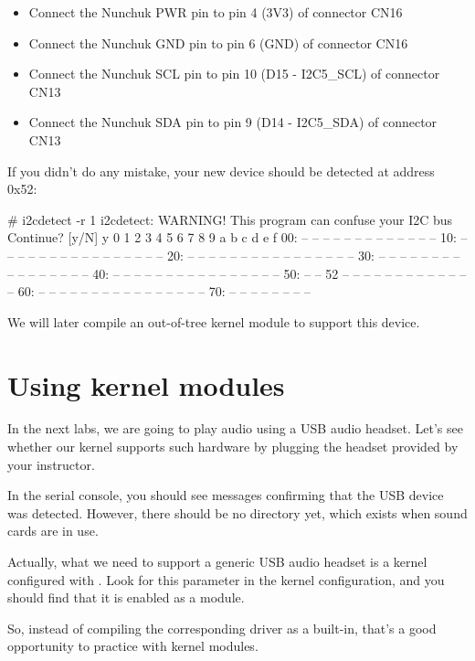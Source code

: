 \begin{itemize}
\item Connect the Nunchuk PWR pin to pin 4 (3V3) of connector CN16
\item Connect the Nunchuk GND pin to pin 6 (GND) of connector CN16
\item Connect the Nunchuk SCL pin to pin 10 (D15 - I2C5\_SCL) of connector CN13
\item Connect the Nunchuk SDA pin to pin 9 (D14 - I2C5\_SDA) of connector CN13
\end{itemize}

If you didn't do any mistake, your new device should be detected at
address 0x52:

\begin{bashinput}
# i2cdetect -r 1
i2cdetect: WARNING! This program can confuse your I2C bus
Continue? [y/N] y
     0  1  2  3  4  5  6  7  8  9  a  b  c  d  e  f
00:          -- -- -- -- -- -- -- -- -- -- -- -- --
10: -- -- -- -- -- -- -- -- -- -- -- -- -- -- -- --
20: -- -- -- -- -- -- -- -- -- -- -- -- -- -- -- --
30: -- -- -- -- -- -- -- -- -- -- -- -- -- -- -- --
40: -- -- -- -- -- -- -- -- -- -- -- -- -- -- -- --
50: -- -- 52 -- -- -- -- -- -- -- -- -- -- -- -- --
60: -- -- -- -- -- -- -- -- -- -- -- -- -- -- -- --
70: -- -- -- -- -- -- -- --
\end{bashinput}

We will later compile an out-of-tree kernel module to support this device.

\section{Using kernel modules}

In the next labs, we are going to play audio using a USB audio headset.
Let's see whether our kernel supports such hardware by plugging the
headset provided by your instructor.

In the serial console, you should see messages confirming that the
USB device was detected. However, there should be no 
directory yet, which exists when sound cards are in use.

Actually, what we need to support a generic USB audio headset is
a kernel configured with . Look for this
parameter in the kernel configuration, and you should find that
it is enabled as a module.

So, instead of compiling the corresponding driver as a built-in, that's
a good opportunity to practice with kernel modules.

